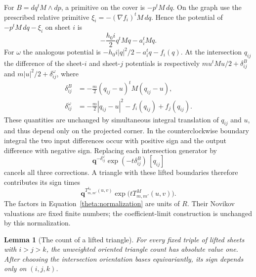 \documentclass[11pt]{article}
\newtheorem{lemma}[theorem]{Lemma}
\theoremstyle{definition}
\theoremstyle{remark}
\newcommand{\qnov}{\mathbf q}
\numberwithin{equation}{section}
\begin{document}
For $B=dq^tM\wedge dp$, a primitive on the cover is $-p^tM\,dq$.
On the graph use the prescribed relative primitive
$\xi_i=-(\nabla f_i)^tM\,dq$.  Hence the potential of
$-p^tM\,dq-\xi_i$ on sheet $i$ is
\[
 -\frac{h_0i}{2}q^tMq-a_i^tMq.
\]
For $\omega$ the analogous potential is
$-h_0i|q|^2/2-a_i^tq-f_i(q)$.  At the intersection $q_{ij}$ the difference
of the sheet-$i$ and sheet-$j$ potentials is respectively
$mu^tMu/2+\delta^B_{ij}$ and $m|u|^2/2+\delta^\omega_{ij}$, where
\begin{equation}\label{theta:corner-corrections}
 \begin{split}
 \delta^B_{ij}&=-\frac m2(q_{ij}-u)^tM(q_{ij}-u),\\
 \delta^\omega_{ij}&=-\frac m2|q_{ij}-u|^2-f_i(q_{ij})+f_j(q_{ij}).
 \end{split}
\end{equation}
These quantities are unchanged by simultaneous integral translation of
$q_{ij}$ and $u$, and thus depend only on the projected corner.  In the
counterclockwise boundary integral the two input differences occur with
positive sign and the output difference with negative sign.  Replacing
each intersection generator by
\begin{equation}\label{theta:normalization}
 \qnov^{-\delta^\omega_{ij}}
       \exp(-t\delta^B_{ij})\, [q_{ij}]
\end{equation}
cancels all three corrections.  A triangle with these lifted boundaries
therefore contributes its sign times
\[
 \qnov^{T^{1_8}_{m,m'}(u,v)}
       \exp\bigl(tT^M_{m,m'}(u,v)\bigr).
\]
The factors in Equation~\eqref{theta:normalization} are units of $R$.
Their Novikov valuations are fixed finite numbers; the coefficient-limit
construction is unchanged by this normalization.

\begin{lemma}[The count of a lifted triangle]\label{theta:triangle-count}
For every fixed triple of lifted sheets with $i>j>k$, the unweighted
oriented triangle count has absolute value one.  After choosing the
intersection orientation bases equivariantly, its sign depends only on
$(i,j,k)$.
\end{lemma}
\end{document}
